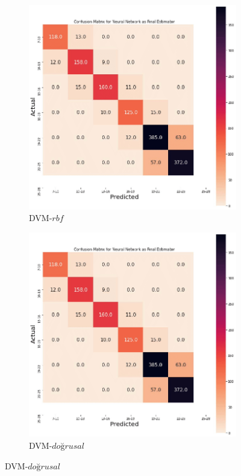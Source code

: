 \begin{figure}[hbt!]

\begin{subfigure}{.475\linewidth}
  \includegraphics[trim={0 0 0 0.72cm},clip,width=\linewidth]{gorseller/Confusion-Matrix.png}
  \caption{DVM-$rbf$}
  \label{MLEDdet0}
\end{subfigure}\hfill %
\begin{subfigure}{.475\linewidth}
  \includegraphics[trim={0 0 0 0.72cm},clip,width=\linewidth]{gorseller/Confusion-Matrix.png}
  \caption{DVM-$\textit{doğrusal}$}
  \label{energydetPSK0}
\end{subfigure}


\end{figure}
